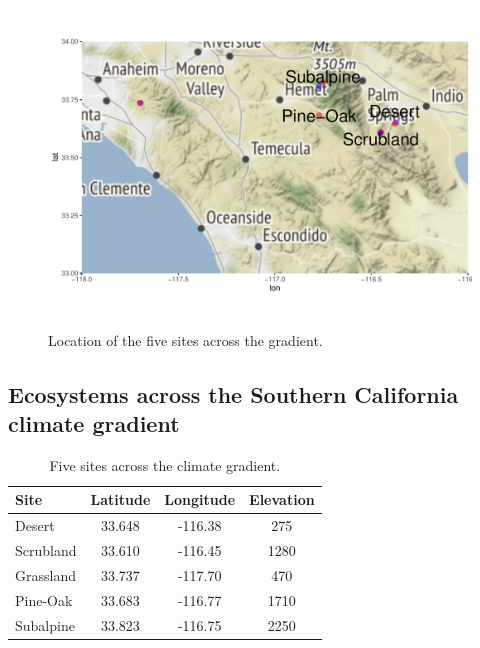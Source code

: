 \documentclass[letterpaper, 10pt]{article}
\begin{document}
\begin{figure}[h]
\centering
      \includegraphics[scale=0.5]{site_location_v1.pdf}
      \caption{Location of the five sites across the gradient.}
      \label{fig: figure 1}
\end{figure}

\subsection{\large Ecosystems across the Southern California climate gradient}

\begin{table}[h!]
  \begin{center}
    \caption{Five sites across the climate gradient.}
    \label{tab: table1}
    \begin{tabular}{lccc}
      \toprule %
      \textbf{Site} & \textbf{Latitude} & \textbf{Longitude} & \textbf{Elevation}\\
      \midrule %
      Desert       & 33.648 & -116.38 & 275\\
      Scrubland & 33.610 & -116.45 & 1280\\
      Grassland & 33.737 & -117.70 & 470\\
      Pine-Oak  & 33.683 & -116.77  & 1710\\
      Subalpine & 33.823 & -116.75  & 2250\\
      \bottomrule %
    \end{tabular}
  \end{center}
\end{table}
\end{document}
